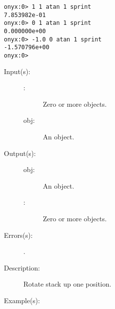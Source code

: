 \begin{description}
\begin{description}
\begin{verbatim}
onyx:0> 1 1 atan 1 sprint
7.853982e-01
onyx:0> 0 1 atan 1 sprint
0.000000e+00
onyx:0> -1.0 0 atan 1 sprint
-1.570796e+00
onyx:0>
		\end{verbatim}
	\end{description}
\label{systemdict:aup}
\item[{\onyxop{\commas obj}{aup}{obj \commas}}: ]
	\begin{description}\item[]
	\item[Input(s): ]
		\begin{description}\item[]
		\item[\commas: ]
			Zero or more objects.
		\item[obj: ]
			An object.
		\end{description}
	\item[Output(s): ]
		\begin{description}\item[]
		\item[obj: ]
			An object.
		\item[\commas: ]
			Zero or more objects.
		\end{description}
	\item[Errors(s): ]
		\begin{description}\item[]
		\item[.]
		\end{description}
	\item[Description: ]
		Rotate stack up one position.
	\item[Example(s): ]\begin{verbatim}


\end{verbatim}
\end{description}
\end{description}
